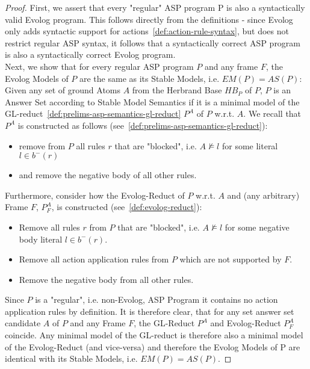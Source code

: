 \begin{proof}
First, we assert that every "regular" ASP program P is also a syntactically valid Evolog program. This follows directly from the definitions - since Evolog only adds syntactic support for actions~\ref{def:action-rule-syntax}, but does not restrict regular ASP syntax, it follows that a syntactically correct ASP program is also a syntactically correct Evolog program. \\
Next, we show that for every regular ASP program $P$ and any frame $F$, the Evolog Models of $P$ are the same as its Stable Models, i.e. $\mathit{EM}(P)=\mathit{AS}(P)$: \\
Given any set of ground Atoms $A$ from the Herbrand Base $HB_P$ of $P$, $P$ is an Answer Set according to Stable Model Semantics if it is a minimal model of the GL-reduct~\ref{def:prelims-asp-semantics-gl-reduct} $P^{A}$ of $P$ w.r.t. $A$. We recall that $P^{A}$ is constructed as follows (see~\ref{def:prelims-asp-semantics-gl-reduct}):
\begin{itemize}
	\item remove from $P$ all rules $r$ that are "blocked", i.e. $A \not\models l$ for some literal $l \in b^{-}(r)$ 
	\item and remove the negative body of all other rules.
\end{itemize}
Furthermore, consider how the Evolog-Reduct of $P$ w.r.t. $A$ and (any arbitrary) Frame $F$, $P_{F}^{A}$, is constructed (see~\ref{def:evolog-reduct}):
\begin{itemize}
	\item Remove all rules $r$ from $P$ that are "blocked", i.e. $A \not\models l$ for some negative body literal $l \in b^{-}(r)$.
	\item Remove all action application rules from $P$ which are not supported by $F$.
	\item Remove the negative body from all other rules.
\end{itemize}
Since $P$ is a "regular", i.e. non-Evolog, ASP Program it contains no action application rules by definition. It is therefore clear, that for any set answer set candidate $A$ of $P$ and any Frame $F$, the GL-Reduct $P^{A}$ and Evolog-Reduct $P_{F}^{A}$ coincide. Any minimal model of the GL-reduct is therefore also a minimal model of the Evolog-Reduct (and vice-versa) and therefore the Evolog Models of P are identical with its Stable Models, i.e. $\mathit{EM}(P)=\mathit{AS}(P)$.
\end{proof}
